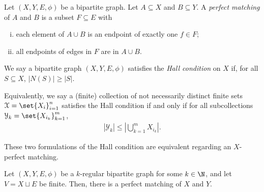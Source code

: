 \begin{definition}
  Let $\left(X,Y,E,\phi\right)$ be a bipartite graph. Let $A\subseteq X$ and $B\subseteq Y$. A \textit{perfect matching} of $A$ and $B$ is a subset $F\subseteq E$ with
  \begin{enumerate}[(i)]
    \item each element of $A\cup B$ is an endpoint of exactly one $f\in F$;
    \item all endpoints of edges in $F$ are in $A\cup B$.
  \end{enumerate}
\end{definition}
\begin{definition}
  We say a bipartite graph $\left(X,Y,E,\phi\right)$ satisfies the \textit{Hall condition} on $X$ if, for all $S\subseteq X$, $\left\vert N(S) \right\vert \geq \left\vert S \right\vert$.\newline

  Equivalently, we say a (finite) collection of not necessarily distinct finite sets $\mathcal{X} = \set{X_i}_{i=1}^{n}$ satisfies the Hall condition if and only if for all subcollections $\mathcal{Y}_k = \set{X_{i_k}}_{k=1}^{m}$,
  \begin{align*}
    \left\vert \mathcal{Y}_k \right\vert \leq \left\vert \bigcup_{k=1}^{m}X_{i_k} \right\vert.
  \end{align*}
\end{definition}
\begin{remark}
These two formulations of the Hall condition are equivalent regarding an $X$-perfect matching.
\end{remark}
\begin{theorem}
  Let $\left(X,Y,E,\phi\right)$ be a $k$-regular bipartite graph for some $k\in \N$, and let $V = X\sqcup E$ be finite. Then, there is a perfect matching of $X$ and $Y$.\label{thm:hall_finite}
\end{theorem}

